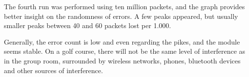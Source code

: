The fourth run was performed using ten million packets, and the graph provides better insight on the randomness of errors. A few peaks appeared, but usually smaller peaks between 40 and 60 packets lost per 1.000.

Generally, the error count is low and even regarding the pikes, and the module seems stable. On a golf course, there will not be the same level of interference as in the group room, surrounded by wireless networks, phones, bluetooth devices and other sources of interference.

